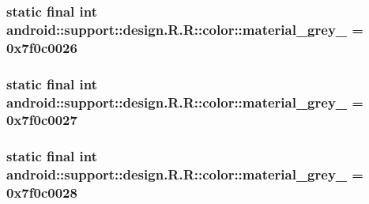 \hypertarget{classandroid_1_1support_1_1design_1_1_r_1_1color_4e5cf6c5e12d83ade5aa79c12912c543}{
\subsubsection[{material\_\-grey\_\-50}]{\setlength{\rightskip}{0pt plus 5cm}static final int android::support::design.R.R::color::material\_\-grey\_ = 0x7f0c0026}}
\label{classandroid_1_1support_1_1design_1_1_r_1_1color_4e5cf6c5e12d83ade5aa79c12912c543}


\hypertarget{classandroid_1_1support_1_1design_1_1_r_1_1color_9958f2cf9b6f759036e98905b22cc476}{
\subsubsection[{material\_\-grey\_\-600}]{\setlength{\rightskip}{0pt plus 5cm}static final int android::support::design.R.R::color::material\_\-grey\_ = 0x7f0c0027}}
\label{classandroid_1_1support_1_1design_1_1_r_1_1color_9958f2cf9b6f759036e98905b22cc476}


\hypertarget{classandroid_1_1support_1_1design_1_1_r_1_1color_c3da0e9326e59e5bdf87a1e0b2c95697}{
\subsubsection[{material\_\-grey\_\-800}]{\setlength{\rightskip}{0pt plus 5cm}static final int android::support::design.R.R::color::material\_\-grey\_ = 0x7f0c0028}}
\label{classandroid_1_1support_1_1design_1_1_r_1_1color_c3da0e9326e59e5bdf87a1e0b2c95697}


